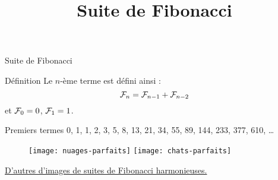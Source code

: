 \documentclass[10pt]{beamer}
\title{Suite de Fibonacci}
\newcommand{\F}[1]{\ensuremath{{\cal F}_{#1}}\xspace}
\begin{document}
\maketitle

\begin{frame}{Suite de Fibonacci}

  \begin{block}{Définition}
    Le $n$-ème terme est défini ainsi :
    \begin{equation*}
      \F{n} = \F{n-1} + \F{n-2}
    \end{equation*}
    et $\F{0} = 0$, $\F{1} = 1$.
  \end{block}

  \begin{exampleblock}{Premiers termes}
    0, 1, 1, 2, 3, 5, 8, 13, 21, 34, 55, 89, 144, 233, 377, 610, \dots
  \end{exampleblock}
  \begin{figure}[htbp]
    \centering
    \texttt{[image: nuages-parfaits]}
    \hfill
    \texttt{[image: chats-parfaits]}
  \end{figure}
  \href{https://archzine.fr/lifestyle/art/suite-de-fibonacci-harmonieuse/}{D'autres d'images de suites de Fibonacci harmonieuses.}

\end{frame}
\end{document}
